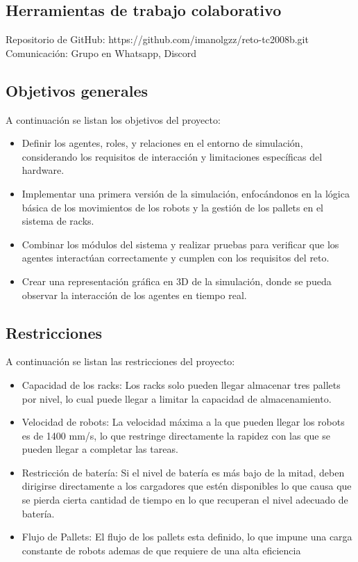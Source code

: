 \documentclass[sjournal]{IEEEtran}
\begin{document}
\subsection{Herramientas de trabajo colaborativo}
Repositorio de GitHub: https://github.com/imanolgzz/reto-tc2008b.git
Comunicación: Grupo en Whatsapp, Discord 


\subsection{Objetivos generales}
A continuación se listan los objetivos del proyecto:
\begin{itemize}
    \item Definir los agentes, roles, y relaciones en el entorno de simulación, considerando los requisitos de interacción y limitaciones específicas del hardware.
    \item Implementar una primera versión de la simulación, enfocándonos en la lógica básica de los movimientos de los robots y la gestión de los pallets en el sistema de racks.
    \item Combinar los módulos del sistema y realizar pruebas para verificar que los agentes interactúan correctamente y cumplen con los requisitos del reto.
    \item Crear una representación gráfica en 3D de la simulación, donde se pueda observar la interacción de los agentes en tiempo real.
    
\end{itemize}

\subsection{Restricciones}
A continuación se listan las restricciones del proyecto:
\begin{itemize}
    \item Capacidad de los racks: Los racks solo pueden llegar almacenar tres pallets por nivel, lo cual puede llegar a limitar la capacidad de almacenamiento.
    \item Velocidad de robots: La velocidad máxima a la que pueden llegar los robots es de 1400 mm/s, lo que restringe directamente la rapidez con las que se pueden llegar a completar las tareas.

    \item Restricción de batería: Si el nivel de batería es más bajo de la mitad, deben dirigirse directamente a los cargadores que estén disponibles lo que causa que se pierda cierta cantidad de tiempo en lo que recuperan el nivel adecuado de batería.
    \item Flujo de Pallets: El flujo de los pallets esta definido, lo que impune una carga constante de robots ademas de que requiere de una alta eficiencia
\end{itemize}
\end{document}
